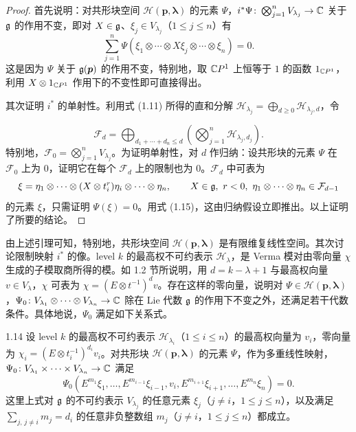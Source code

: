 \begin{proof}
首先说明：对共形块空间 $\mathcal{H}(\bm p,\bm\lambda)$ 的元素 $\Psi$，$i^{*}\Psi\colon\bigotimes_{j=1}^{n}V_{\lambda_j}\to\mathbb{C}$ 关于 $\mathfrak{g}$ 的作用不变，即对 $X\in\mathfrak{g}$、$\xi_j\in V_{\lambda_j}$（$1\le j\le n$）有
\[
  \sum_{j=1}^{n}\Psi(\xi_1\otimes\cdots\otimes X\xi_j\otimes\cdots\otimes\xi_n)=0 .
\]
这是因为 $\Psi$ 关于 $\mathfrak{g}(\bm p)$ 的作用不变，特别地，取 $\mathbb{C}P^1$ 上恒等于 $1$ 的函数 $1_{\mathbb{C}P^1}$，利用 $X\otimes1_{\mathbb{C}P^1}$ 作用下的不变性即可直接得出。

其次证明 $i^{*}$ 的单射性。利用式 (1.11) 所得的直和分解 $\mathcal{H}_{\lambda_j}=\bigoplus_{d\ge0}\mathcal{H}_{\lambda_j,d}$，令

\[
  \mathcal{F}_d=\bigoplus_{d_1+\cdots+d_n\le d}
  \left(\bigotimes_{j=1}^{n}\mathcal{H}_{\lambda_j,d_j}\right).
\]
特别地，$\mathcal{F}_0=\bigotimes_{j=1}^{n}V_{\lambda_j}$。为证明单射性，对 $d$ 作归纳：设共形块的元素 $\Psi$ 在 $\mathcal{F}_0$ 上为 $0$，证明它在每个 $\mathcal{F}_d$ 上的限制也为 $0$。$\mathcal{F}_d$ 中可表为
\[
  \xi=\eta_1\otimes\cdots\otimes(X\otimes t_i^{r})\eta_i\otimes\cdots\otimes\eta_n,\qquad
  X\in\fg,\ r<0,\ \eta_1\otimes\cdots\otimes\eta_n\in\mathcal{F}_{d-1}
\]
的元素 $\xi$，只需证明 $\Psi(\xi)=0$。用式 (1.15)，这由归纳假设立即推出。以上证明了所要的结论。
\end{proof}

由上述引理可知，特别地，共形块空间 $\mathcal{H}(\bm p,\bm\lambda)$ 是有限维复线性空间。其次讨论限制映射 $i^{*}$ 的像。level $k$ 的最高权不可约表示 $\mathcal{H}_\lambda$，是 Verma 模对由零向量 $\chi$ 生成的子模取商所得的模。如 1.2 节所说明，用 $d=k-\lambda+1$ 与最高权向量 $v\in V_\lambda$，$\chi$ 可表为 $\chi=(E\otimes t^{-1})^{d}v$。存在这样的零向量，说明对 $\Psi\in\mathcal{H}(\bm p,\bm\lambda)$，$\Psi_0\colon V_{\lambda_1}\otimes\cdots\otimes V_{\lambda_n}\to\mathbb{C}$ 除在 Lie 代数 $\mathfrak{g}$ 的作用下不变之外，还满足若干代数条件。具体地说，$\Psi_0$ 满足如下关系式。

\begin{proposition*}{1.14}
设 level $k$ 的最高权不可约表示 $\mathcal{H}_{\lambda_i}$（$1\le i\le n$）的最高权向量为 $v_i$，零向量为 $\chi_i=(E\otimes t_i^{-1})^{d_i}v_i$。对共形块 $\mathcal{H}(\bm p,\bm\lambda)$ 的元素 $\Psi$，作为多重线性映射，$\Psi_0\colon V_{\lambda_1}\times\cdots\times V_{\lambda_n}\to\mathbb{C}$ 满足
\begin{equation}
  \Psi_0(E^{m_1}\xi_1,\dots,E^{m_{i-1}}\xi_{i-1},v_i,E^{m_{i+1}}\xi_{i+1},\dots,E^{m_n}\xi_n)=0 .
  \tag{1.16}
\end{equation}
这里上式对 $\mathfrak{g}$ 的不可约表示 $V_{\lambda_j}$ 的任意元素 $\xi_j$（$j\ne i$，$1\le j\le n$），以及满足 $\sum_{j,\,j\ne i}m_j=d_i$ 的任意非负整数组 $m_j$（$j\ne i$，$1\le j\le n$）都成立。
\end{proposition*}


